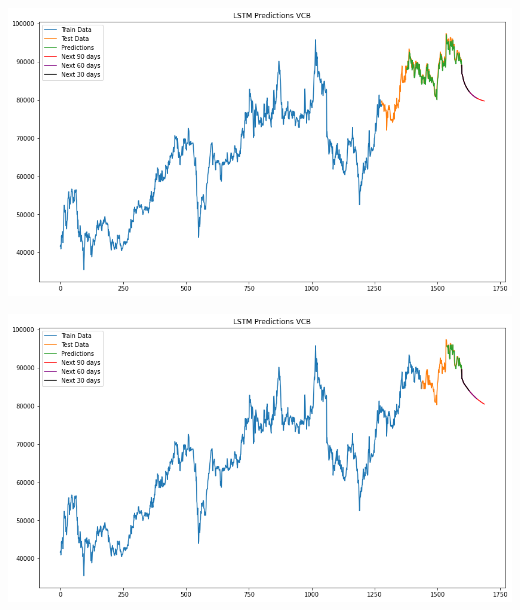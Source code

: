 \documentclass[conference]{IEEEtran}
\begin{document}
\begin{minipage}{0.23\textwidth}
    \centering
    \includegraphics[width=\linewidth]{images/LSTM/LSTM_VCB_82.png}
    \label{fig:image1}
\end{minipage}
\hfill
\begin{minipage}{0.23\textwidth}
    \centering
    \includegraphics[width=\linewidth]{images/LSTM/LSTM_VCB_91.png}
    \label{fig:image2}
\end{minipage}
\end{document}
